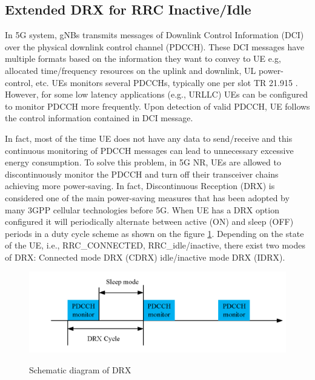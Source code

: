\documentclass[conference]{IEEEtran}
\begin{document}
\subsection{Extended DRX for RRC Inactive/Idle}
\label{sec:5-1}

In 5G system, gNBs transmits messages of Downlink Control Information (DCI) over the physical downlink control channel (PDCCH). These DCI messages have multiple formats based on the information they want to convey to UE  e.g, allocated time/frequency resources on the uplink and downlink, UL power-control, etc. UEs monitors several PDCCHs, typically one per slot TR 21.915 \cite{3gpp.21.915}. However, for some low latency applications (e.g., URLLC) UEs can be configured to monitor PDCCH more frequently. Upon detection of valid PDCCH, UE follows the control information contained in DCI message.

In fact, most of the time UE does not have any data to send/receive and this continuous monitoring of PDCCH messages can lead to unnecessary excessive energy consumption. To solve this problem, in 5G NR, UEs are allowed to discontinuously monitor the PDCCH and turn off their transceiver chains achieving more power-saving. In fact, Discontinuous Reception (DRX) is considered one of the main power-saving measures that has been adopted by many 3GPP cellular technologies before 5G. When UE has a DRX option configured it will periodically alternate between active (ON) and sleep (OFF) periods in a duty cycle scheme as shown on the figure \ref{fig:5g-drx}. Depending on the state of the UE, i.e., RRC\_CONNECTED, RRC\_idle/inactive, there exist two modes of DRX: Connected mode DRX (CDRX) idle/inactive mode DRX (IDRX).

\begin{figure}
    \centering
    \includegraphics[width=\linewidth]{Pictures/Schematic diagram of DRX.png}
    \label{fig:5g-drx}
    \caption{Schematic diagram of DRX}
\end{figure}
\end{document}
